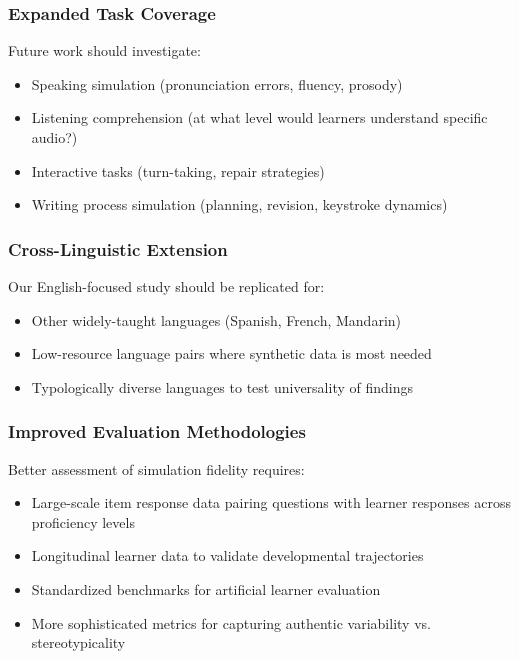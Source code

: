 \subsubsection{Expanded Task Coverage}

Future work should investigate:
\begin{itemize}
    \item Speaking simulation (pronunciation errors, fluency, prosody)
    \item Listening comprehension (at what level would learners understand specific audio?)
    \item Interactive tasks (turn-taking, repair strategies)
    \item Writing process simulation (planning, revision, keystroke dynamics)
\end{itemize}

\subsubsection{Cross-Linguistic Extension}

Our English-focused study should be replicated for:
\begin{itemize}
    \item Other widely-taught languages (Spanish, French, Mandarin)
    \item Low-resource language pairs where synthetic data is most needed
    \item Typologically diverse languages to test universality of findings
\end{itemize}

\subsubsection{Improved Evaluation Methodologies}

Better assessment of simulation fidelity requires:
\begin{itemize}
    \item Large-scale item response data pairing questions with learner responses across proficiency levels
    \item Longitudinal learner data to validate developmental trajectories
    \item Standardized benchmarks for artificial learner evaluation
    \item More sophisticated metrics for capturing authentic variability vs. stereotypicality
\end{itemize}

